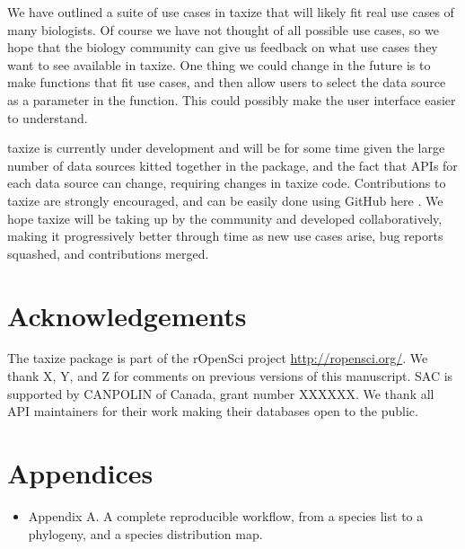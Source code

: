 \documentclass[letterpaper,superscriptaddress,showkeys,longbibliography,10pt]{revtex4-1}\usepackage{graphicx, color}
\begin{document}
We have outlined a suite of use cases in taxize that will likely fit real use cases of many biologists. Of course we have not thought of all possible use cases, so we hope that the biology community can give us feedback on what use cases they want to see available in taxize. One thing we could change in the future is to make  functions that fit use cases, and then allow users to select the data source as a parameter in the function. This could possibly make the user interface easier to understand.

taxize is currently under development and will be for some time given the large number of data sources kitted together in the package, and the fact that APIs for each data source can change, requiring changes in taxize code. Contributions to taxize are strongly encouraged, and can be easily done using GitHub here \cite{github_taxize}. We hope taxize will be taking up by the community and developed collaboratively, making it progressively better through time as new use cases arise, bug reports squashed, and contributions merged.


\section{Acknowledgements}

The taxize package is part of the rOpenSci project \url{http://ropensci.org/}. We thank X, Y, and Z for comments on previous versions of this manuscript. SAC is supported by CANPOLIN of Canada, grant number XXXXXX. We thank all API maintainers for their work making their databases open to the public.

\section{Appendices}

\begin{itemize}
    \item{Appendix A.} A complete reproducible workflow, from a species list to a phylogeny, and a species distribution map. 
\end{itemize}



\end{document}
